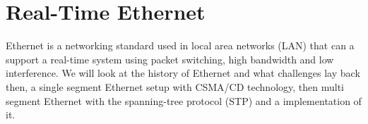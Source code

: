 \chapter{Real-Time Ethernet} \label{ch:realTimeEthernet}

Ethernet is a networking standard used in local area networks (LAN) that can a support a real-time system using packet switching, high bandwidth and low interference. We will look at the history of Ethernet and what challenges lay back then, a single segment Ethernet setup with CSMA/CD technology, then multi segment Ethernet with the spanning-tree protocol (STP) and a implementation of it.





